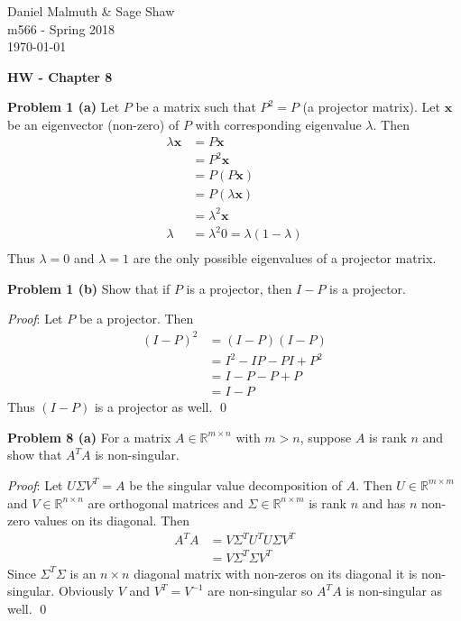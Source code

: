 \documentclass[12pt]{article}
\newcommand{\problem}[1]{\hspace{-4 ex} \large \textbf{Problem #1} }
\renewenvironment{proof}{\hspace{-4 ex} \emph{Proof}:}{\qed}
\newcommand{\RR}{\mathbb{R}}
\begin{document}
	\thispagestyle{empty}
	
	\begin{flushright}
		Daniel Malmuth \& Sage Shaw \\
		m566 - Spring 2018 \\
		\today
	\end{flushright}
	
{\large \textbf{HW - Chapter 8}}\bigbreak

\problem{1 (a)} Let $P$ be a matrix such that $P^2 = P$ (a projector matrix). Let $\mathbf{x}$ be an eigenvector (non-zero) of $P$ with corresponding eigenvalue $\lambda$. Then
\begin{align*}
	\lambda \mathbf{x} & = P \mathbf{x} \\
	& = P^2 \mathbf{x}\\
	& = P (P \mathbf{x}) \\
	& = P(\lambda \mathbf{x}) \\
	& = \lambda^2 \mathbf{x} \\
	\lambda & = \lambda^2
	0 = \lambda(1- \lambda) \\
\end{align*}
Thus $\lambda = 0$ and $\lambda = 1$ are the only possible eigenvalues of a projector matrix.

\bigbreak

\problem{1 (b)} Show that if $P$ is a projector, then $I-P$ is a projector.

\begin{proof}
	Let $P$ be a projector. Then
	\begin{align*}
		(I-P)^2 & = (I-P)(I-P) \\
		& = I^2 - IP - PI + P^2 \\
		& = I - P - P + P \\
		& = I - P
	\end{align*}
	Thus $(I-P)$ is a projector as well.
\end{proof}

\bigbreak

\problem{8 (a)} For a matrix $A \in \RR^{m \times n}$ with $m>n$, suppose $A$ is rank $n$ and show that $A^TA$ is non-singular.

\begin{proof}
	Let $U\Sigma V^T = A$ be the singular value decomposition of $A$. Then $U \in \RR^{m \times m}$ and $V \in \RR^{n\times n}$ are orthogonal matrices and $\Sigma \in \RR^{n \times m}$ is rank $n$ and has $n$ non-zero values on its diagonal. Then
	\begin{align*}
		A^TA & = V \Sigma^T U^T U \Sigma V^T \\
		& = V \Sigma^T \Sigma V^T
	\end{align*}
	Since $\Sigma ^T \Sigma$ is an $n \times n$ diagonal matrix with non-zeros on its diagonal it is non-singular. Obviously $V$ and $V^T=V^{-1}$ are non-singular so $A^TA$ is non-singular as well.
\end{proof}
\end{document}
